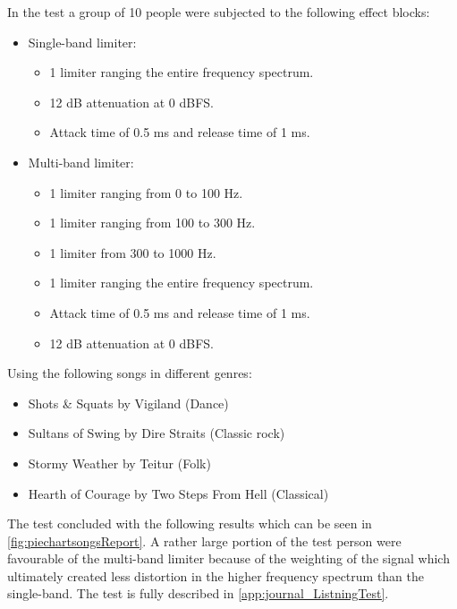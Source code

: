 In the test a group of 10 people were subjected to the following effect blocks:
 \begin{itemize}
    \item Single-band limiter:
    \begin{itemize}
    \item 1 limiter ranging the entire frequency spectrum.
    \item 12 dB attenuation at 0 dBFS.
    \item Attack time of 0.5 ms and release time of 1 ms.
    \end{itemize}
    \item Multi-band limiter:
    \begin{itemize}
    \item 1 limiter ranging from 0 to 100 Hz.
    \item 1 limiter ranging from 100 to 300 Hz.
    \item 1 limiter from 300 to 1000 Hz.
    \item 1 limiter ranging the entire frequency spectrum.
    \item Attack time of 0.5 ms and release time of 1 ms.
    \item 12 dB attenuation at 0 dBFS.
    \end{itemize}
 \end{itemize}
Using the following songs in different genres:
\begin{itemize}
\item Shots \& Squats by Vigiland (Dance)
\item Sultans of Swing by Dire Straits (Classic rock)
\item Stormy Weather by Teitur (Folk)
\item Hearth of Courage by Two Steps From Hell (Classical)
\end{itemize}
The test concluded with the following results which can be seen in \autoref{fig:piechartsongsReport}. A rather large portion of the test person were favourable of the multi-band limiter because of the weighting of the signal which ultimately created less distortion in the higher frequency spectrum than the single-band. The test is fully described in \autoref{app:journal_ListningTest}.

